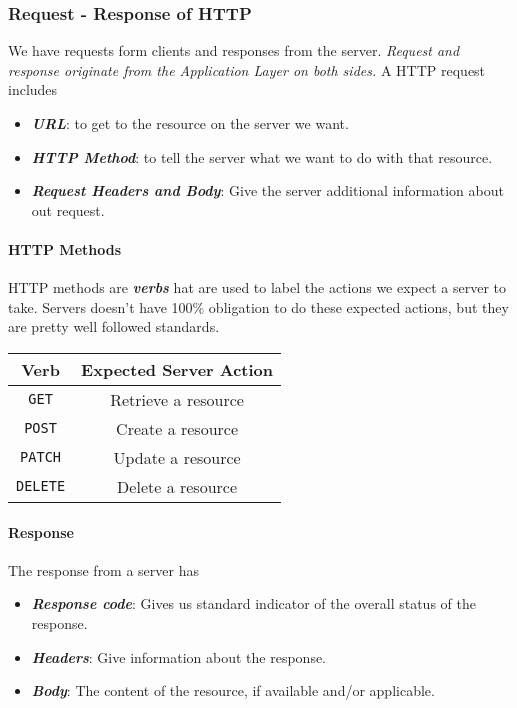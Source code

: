 \documentclass[10pt]{article}
\begin{document}
\subsubsection{Request - Response of HTTP}
We have requests form clients and responses from the server. \textit{Request and response originate from the Application Layer on both sides.} A HTTP request includes
\begin{itemize}
    \item \textbf{\textit{URL}}: to get to the resource on the server we want.
    \item \textit{\textbf{HTTP Method}}: to tell the server what we want to do with that resource.
    \item \textbf{\textit{Request Headers and Body}}: Give the server additional information about out request. 
\end{itemize}

\paragraph{HTTP Methods}
HTTP methods are \textit{\textbf{verbs}} hat are used to label the actions we expect a server to take. \color{Red} Servers doesn't have 100\% obligation to do these expected actions, but they are pretty well followed standards. \color{Black}
\begin{center}
    \begin{tabular}{|c|c|}
        \hline
        Verb            & Expected Server Action \\ \hline
        \texttt{GET}    & Retrieve a resource    \\ \hline
        \texttt{POST}   & Create a resource      \\ \hline
        \texttt{PATCH}  & Update a resource      \\ \hline
        \texttt{DELETE} & Delete a resource      \\ \hline
    \end{tabular}
\end{center}

\paragraph{Response} The response from a server has
\begin{itemize}
    \item \textit{\textbf{Response code}}: Gives us standard indicator of the overall status of the response.
    \item \textit{\textbf{Headers}}: Give information about the response.
    \item \textit{\textbf{Body}}: The content of the resource, if available and/or applicable.
\end{itemize}
\end{document}
